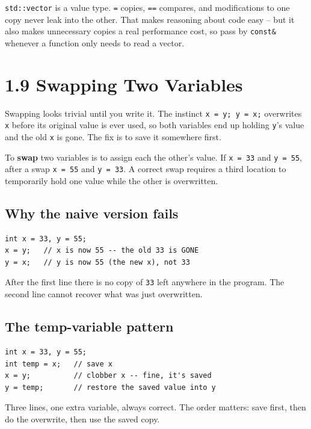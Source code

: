 \documentclass[11pt]{article}
\begin{document}
\begin{ideabox}
\texttt{std::vector} is a value type. \texttt{=} copies,
\texttt{==} compares, and modifications to one copy never leak into
the other. That makes reasoning about code easy -- but it also makes
unnecessary copies a real performance cost, so pass by
\texttt{const\&} whenever a function only needs to read a vector.
\end{ideabox}

\section{1.9 Swapping Two Variables}

Swapping looks trivial until you write it. The instinct
\texttt{x = y; y = x;} overwrites \texttt{x} before its original value is
ever used, so both variables end up holding \texttt{y}'s value and the old
\texttt{x} is gone. The fix is to save it somewhere first.

\begin{defnbox}[Swap]
To \textbf{swap} two variables is to assign each the other's value. If
\texttt{x = 33} and \texttt{y = 55}, after a swap \texttt{x = 55} and
\texttt{y = 33}. A correct swap requires a third location to temporarily
hold one value while the other is overwritten.
\end{defnbox}

\subsection{Why the naive version fails}

\begin{examplebox}
\begin{verbatim}
int x = 33, y = 55;
x = y;   // x is now 55 -- the old 33 is GONE
y = x;   // y is now 55 (the new x), not 33
\end{verbatim}
After the first line there is no copy of \texttt{33} left anywhere in the
program. The second line cannot recover what was just overwritten.
\end{examplebox}

\subsection{The temp-variable pattern}

\begin{examplebox}
\begin{verbatim}
int x = 33, y = 55;
int temp = x;   // save x
x = y;          // clobber x -- fine, it's saved
y = temp;       // restore the saved value into y
\end{verbatim}
Three lines, one extra variable, always correct. The order matters:
save first, then do the overwrite, then use the saved copy.
\end{examplebox}
\end{document}
